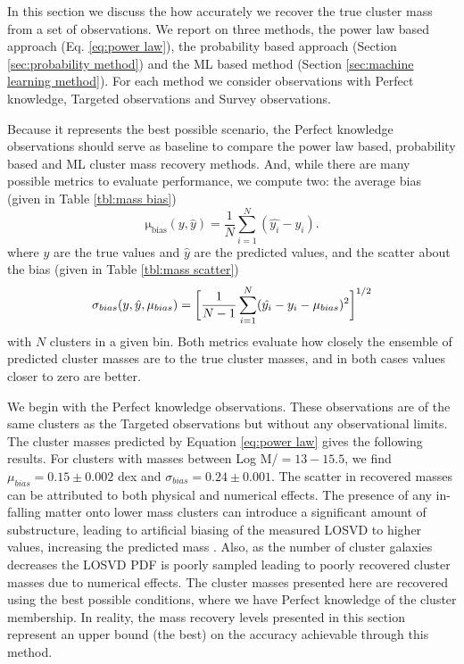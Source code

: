 \documentclass[fleqn,usenatbib]{mnras}
\begin{document}
In this section we discuss the how accurately we recover the true cluster mass from a set of observations. We report on three methods, the power law based approach (Eq. \ref{eq:power law}), the probability based approach (Section \ref{sec:probability method}) and the ML based method (Section \ref{sec:machine learning method}). For each method we consider observations with Perfect knowledge, Targeted observations and Survey observations.

Because it represents the best possible scenario, the Perfect knowledge observations should serve as baseline to compare the power law based, probability based and ML cluster mass recovery methods. And, while there are many possible metrics to evaluate performance, we compute two: the average bias (given in Table \ref{tbl:mass bias})
\begin{equation}
\mathrm{\mu_{bias}}(y,\hat{y}) = \frac{1}{N} \sum_{i=1}^N (\hat{y_i} - y_i).
\end{equation}
where $y$ are the true values and $\hat{y}$ are the predicted values, and the scatter about the bias (given in Table \ref{tbl:mass scatter})
\begin{equation}
	\sigma_{bias}(y,\hat{y}, \mu_{bias}) = \bigg{[}\frac{1}{N-1} \sum_{i=1}^N (\hat{y_i} - y_i - \mu_{bias})^2 \bigg{]}^{1/2}
\end{equation}
with $N$ clusters in a given bin. Both metrics evaluate how closely the ensemble of predicted cluster masses are to the true cluster masses, and in both cases values closer to zero are better.

We begin with the Perfect knowledge observations. These observations are of the same clusters as the Targeted observations but without any observational limits. The cluster masses predicted by Equation \ref{eq:power law} gives the following results. For clusters with masses between Log M/\Msol $= 13 - 15.5$, we find $\mu_{bias} = 0.15\pm{0.002}$ dex and $\sigma_{bias} = 0.24\pm{0.001}$. The scatter in recovered masses can be attributed to both physical and numerical effects. The presence of any in-falling matter onto lower mass clusters can introduce a significant amount of substructure, leading to artificial biasing of the measured LOSVD to higher values, increasing the predicted mass . Also, as the number of cluster galaxies decreases the LOSVD PDF is poorly sampled leading to poorly recovered cluster masses due to numerical effects. The cluster masses presented here are recovered using the best possible conditions, where we have Perfect knowledge of the cluster membership. In reality, the mass recovery levels presented in this section represent an upper bound (the best) on the accuracy achievable through this method.
\end{document}
